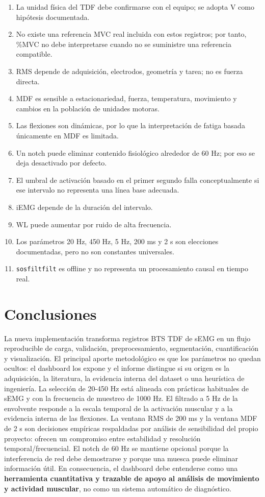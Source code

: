 \documentclass[11pt,spanish]{article}
\begin{document}
\begin{enumerate}
    \item La unidad física del TDF debe confirmarse con el equipo; se adopta V como hipótesis documentada.
    \item No existe una referencia MVC real incluida con estos registros; por tanto, \%MVC no debe interpretarse cuando no se suministre una referencia compatible.
    \item RMS depende de adquisición, electrodos, geometría y tarea; no es fuerza directa.
    \item MDF es sensible a estacionariedad, fuerza, temperatura, movimiento y cambios en la población de unidades motoras.
    \item Las flexiones son dinámicas, por lo que la interpretación de fatiga basada únicamente en MDF es limitada.
    \item Un notch puede eliminar contenido fisiológico alrededor de 60 Hz; por eso se deja desactivado por defecto.
    \item El umbral de activación basado en el primer segundo falla conceptualmente si ese intervalo no representa una línea base adecuada.
    \item iEMG depende de la duración del intervalo.
    \item WL puede aumentar por ruido de alta frecuencia.
    \item Los parámetros 20 Hz, 450 Hz, 5 Hz, 200 ms y 2 s son elecciones documentadas, pero no son constantes universales.
    \item \texttt{sosfiltfilt} es offline y no representa un procesamiento causal en tiempo real.
\end{enumerate}

\section{Conclusiones}

La nueva implementación transforma registros BTS TDF de sEMG en un flujo reproducible de carga, validación, preprocesamiento, segmentación, cuantificación y visualización. El principal aporte metodológico es que los parámetros no quedan ocultos: el dashboard los expone y el informe distingue si su origen es la adquisición, la literatura, la evidencia interna del dataset o una heurística de ingeniería.
La selección de 20-450 Hz está alineada con prácticas habituales de sEMG y con la frecuencia de muestreo de 1000 Hz. El filtrado a 5 Hz de la envolvente responde a la escala temporal de la activación muscular y a la evidencia interna de las flexiones. La ventana RMS de 200 ms y la ventana MDF de 2 s son decisiones empíricas respaldadas por análisis de sensibilidad del propio proyecto: ofrecen un compromiso entre estabilidad y resolución temporal/frecuencial. El notch de 60 Hz se mantiene opcional porque la interferencia de red debe demostrarse y porque una muesca puede eliminar información útil.
En consecuencia, el dashboard debe entenderse como una \textbf{herramienta cuantitativa y trazable de apoyo al análisis de movimiento y actividad muscular}, no como un sistema automático de diagnóstico.
\end{document}
